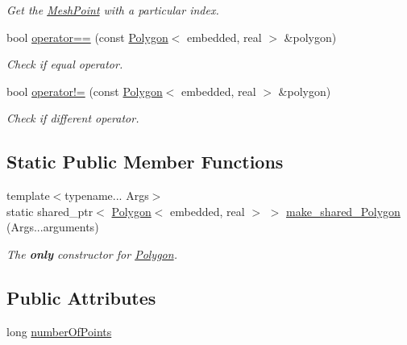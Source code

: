 \begin{DoxyCompactItemize}
\begin{DoxyCompactList}\small\item\em Get the \hyperlink{class_mesh_point}{Mesh\+Point} with a particular index. \end{DoxyCompactList}\item 
bool \hyperlink{class_polygon_aba500dd40a805acea4bf7c050b6ba95a}{operator==} (const \hyperlink{class_polygon}{Polygon}$<$ embedded, real $>$ \&polygon)\hypertarget{class_polygon_aba500dd40a805acea4bf7c050b6ba95a}{}\label{class_polygon_aba500dd40a805acea4bf7c050b6ba95a}

\begin{DoxyCompactList}\small\item\em Check if equal operator. \end{DoxyCompactList}\item 
bool \hyperlink{class_polygon_abf1bf0edcebc33c975d81a704904ae0e}{operator!=} (const \hyperlink{class_polygon}{Polygon}$<$ embedded, real $>$ \&polygon)\hypertarget{class_polygon_abf1bf0edcebc33c975d81a704904ae0e}{}\label{class_polygon_abf1bf0edcebc33c975d81a704904ae0e}

\begin{DoxyCompactList}\small\item\em Check if different operator. \end{DoxyCompactList}\end{DoxyCompactItemize}
\subsection*{Static Public Member Functions}
\begin{DoxyCompactItemize}
\item 
{\footnotesize template$<$typename... Args$>$ }\\static shared\+\_\+ptr$<$ \hyperlink{class_polygon}{Polygon}$<$ embedded, real $>$ $>$ \hyperlink{class_polygon_a2eb322f57f8043dfb195f3514b8b11e7}{make\+\_\+shared\+\_\+\+Polygon} (Args...\+arguments)
\begin{DoxyCompactList}\small\item\em The {\bfseries only} constructor for \hyperlink{class_polygon}{Polygon}. \end{DoxyCompactList}\end{DoxyCompactItemize}
\subsection*{Public Attributes}
\begin{DoxyCompactItemize}
\item 
long \hyperlink{class_polygon_a84d5ff2931fc01477beb2acc4c7448fb}{number\+Of\+Points}
\end{DoxyCompactItemize}

